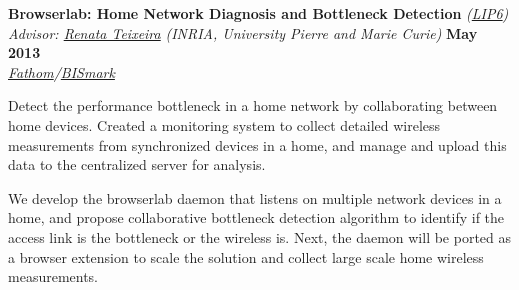 \documentclass[margin,line]{resume}
\begin{document}
\begin{resume}
    \textbf{Browserlab: Home Network Diagnosis and Bottleneck Detection}
    \emph{(\href{http://www.lip6.fr/}{LIP6})} \\
    \hspace{-1pt}\emph{Advisor: \href{http://www-npa.lip6.fr/~teixeira/}{Renata Teixeira}}
    \emph{(INRIA, University Pierre and Marie Curie)}
    \hfill \textbf{May 2013} \\
    \hspace{-1pt}\emph{\href{http://fathom.icsi.berkeley.edu/}{Fathom}/\href{http://projectbismark.net/}{BISmark}}		\\\vspace{-4mm}
    \begin{list2}
    \item Detect the performance bottleneck in a home network by collaborating between home devices. Created a monitoring system to collect detailed wireless measurements from synchronized devices in a home, and manage and upload this data to the centralized server for analysis.
	\item We develop the browserlab daemon that listens on multiple network devices in a home, and propose collaborative bottleneck detection algorithm to identify if the access link is the bottleneck or the wireless is. Next, the daemon will be ported as a browser extension to scale the solution and collect large scale home wireless measurements.
    \end{list2}
\vspace{-2mm}


\end{resume}
\end{document}
